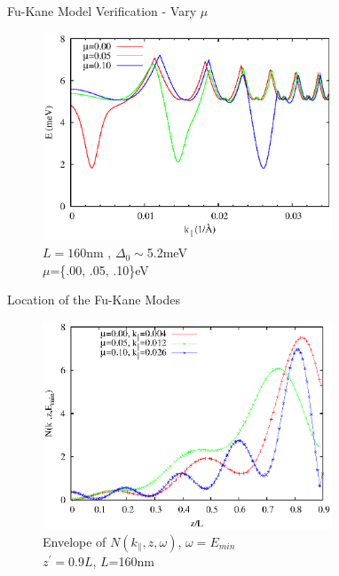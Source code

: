 \documentclass[]{beamer}
\begin{document}
\begin{frame}{Fu-Kane Model Verification - Vary $\mu$}
\begin{figure}
\includegraphics[width=3.4in]{include/disp-mu.eps}\\
$L=160$nm , $\Delta_0\sim$5.2meV \\
$\mu$=\{.00, .05, .10\}eV
\end{figure}
\end{frame}

\begin{frame}{Location of the Fu-Kane Modes}
\begin{figure}
\includegraphics[width=3.4in]{include/spweight.eps}\\
Envelope of $N(k_\parallel,z,\omega)$, $\omega=E_{min}$\\
 $z^\prime=0.9L$, $L$=160nm

\end{figure}
\end{frame}


\end{document}
